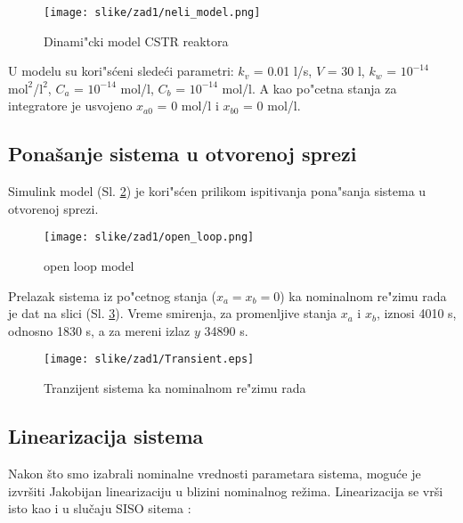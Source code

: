 \documentclass[a4paper,11pt]{article}
\theoremstyle{definition} \newtheorem{deff}{Definicija}[section]
\theoremstyle{definition} \newtheorem{prim}[deff]{Primer}
\theoremstyle{plain} \newtheorem{teor}[deff]{Teorema}
\begin{document}
	\begin{figure}[!h]
		\centering
		\texttt{[image: slike/zad1/neli\_model.png]}
		\caption{Dinami"cki model CSTR reaktora}
		\label{fig:model}
	\end{figure}
	\vspace{2cm}
	
	U modelu su kori"s\'ceni slede\'ci parametri: $k_v$ = 0.01 l/s, $V$ = 30 l, $k_w$ = $10^{-14}$ $\text{mol}^2$/$\text{l}^2$, $C_a$ = $10^{-14}$ mol/l, $C_b$ = $10^{-14}$ mol/l. A kao po"cetna stanja za integratore je usvojeno $x_{a0}$ = 0 mol/l i $x_{b0}$ = 0 mol/l.
	
	
	
	
	
	\clearpage
	
	
	\subsection{Ponašanje sistema u otvorenoj sprezi}
	
	Simulink model (Sl. \ref{fig:ol_model}) je kori"s\'cen prilikom ispitivanja pona"sanja sistema u otvorenoj sprezi.
	
	\begin{figure}[!h]
		\centering
		\texttt{[image: slike/zad1/open\_loop.png]}
		\caption{open loop model}
		\label{fig:ol_model}
	\end{figure}
	
	
	Prelazak sistema iz po"cetnog stanja ($x_a = x_b = 0$) ka nominalnom re"zimu rada je dat na slici (Sl. \ref{fig:ol_tran}). Vreme smirenja, za promenljive stanja $x_a$ i $x_b$, iznosi 4010 s, odnosno 1830 s, a za mereni izlaz $y$ 34890 s.
	
	\begin{figure}[!h]
		\centering
		\texttt{[image: slike/zad1/Transient.eps]}
		\caption{Tranzijent sistema ka nominalnom re"zimu rada }
		\label{fig:ol_tran}
	\end{figure}
	
	
	
	\clearpage 
	\subsection{Linearizacija sistema}
	
	Nakon što smo izabrali nominalne vrednosti parametara sistema, moguće je izvršiti Jakobijan linearizaciju u blizini nominalnog režima. Linearizacija se vrši isto kao i u slučaju SISO sitema :
	
\end{document}

